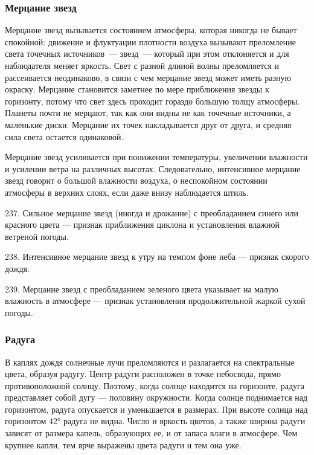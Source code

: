 \subsubsection{Мерцание звезд}

Мерцание звезд вызывается состоянием атмосферы, которая никогда не бывает спокойной: движение и флуктуации плотности воздуха вызывают преломление света точечных источников~--- звезд~--- который при этом отклоняется и для наблюдателя меняет яркость. Свет с разной длиной волны преломляется и рассеивается неодинаково, в связи с чем мерцание звезд может иметь разную окраску. Мерцание становится заметнее по мере приближения звезды к горизонту, потому что свет здесь проходит гораздо большую толщу атмосферы. Планеты почти не мерцают, так как они видны не как точечные источники, а маленькие диски. Мерцание их точек накладывается друг от друга, и средняя сила света остается одинаковой.

Мерцание звезд усиливается при понижении температуры, увеличении влажности и усилении ветра на различных высотах. Следовательно, интенсивное мерцание звезд говорит о большой влажности воздуха, о неспокойном состоянии атмосферы в верхних слоях, если даже внизу наблюдается штиль.

237. Сильное мерцание звезд (иногда и дрожание) с преобладанием синего или красного цвета — признак приближения циклона и установления влажной ветреной погоды.

238. Интенсивное мерцание звезд к утру на темпом фоне неба — признак скорого дождя.

239. Мерцание звезд с преобладанием зеленого цвета указывает на малую влажность в атмосфере — признак установления продолжительной жаркой сухой погоды.

\subsubsection{Радуга}

В каплях дождя солнечные лучи преломляются и разлагается на спектральные цвета, образуя радугу. Центр радуги расположен в точке небосвода, прямо противоположной солнцу. Поэтому, когда солнце находится на горизонте, радуга представляет собой дугу — половину окружности. Когда солнце поднимается над горизонтом, радуга опускается и уменьшается в размерах. При высоте солнца над горизонтом 42° радуга не видна. Число и яркость цветов, а также ширина радуги зависят от размера капель, образующих ее, и от запаса влаги в атмосфере. Чем крупнее капли, тем ярче выражены цвета радуги и тем она уже.

